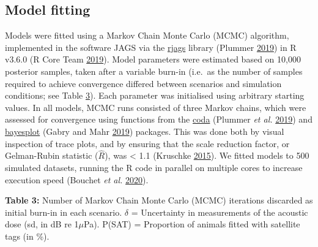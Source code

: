 \documentclass[
]{article}
\begin{document}
\subsection{Model fitting}

Models were fitted using a Markov Chain Monte Carlo (MCMC) algorithm, implemented in the software JAGS via the \href{https://cran.r-project.org/web/packages/rjags/index.html}{rjags} library (Plummer \protect\hyperlink{ref-Plummer2019}{2019}) in R v3.6.0 (R Core Team \protect\hyperlink{ref-RDev2019}{2019}). Model parameters were estimated based on 10,000 posterior samples, taken after a variable burn-in (i.e.~as the number of samples required to achieve convergence differed between scenarios and simulation conditions; see Table \hyperlink{tab3}{3}). Each parameter was initialised using arbitrary starting values. In all models, MCMC runs consisted of three Markov chains, which were assessed for convergence using functions from the \href{https://cran.r-project.org/web/packages/coda/index.html}{coda} (Plummer \emph{et al.} \protect\hyperlink{ref-Plummer2019b}{2019}) and \href{https://mc-stan.org/bayesplot/}{bayesplot} (Gabry and Mahr \protect\hyperlink{ref-Gabry2019}{2019}) packages. This was done both by visual inspection of trace plots, and by ensuring that the scale reduction factor, or Gelman-Rubin statistic (\(\hat{R}\)), was \textless{} 1.1 (Kruschke \protect\hyperlink{ref-Kruschke2010}{2015}). We fitted models to 500 simulated datasets, running the R code in parallel on multiple cores to increase execution speed (Bouchet \emph{et al.} \protect\hyperlink{ref-Bouchet2020b}{2020}).

\textbf{Table 3:} \hypertarget{tab3}{}Number of Markov Chain Monte Carlo (MCMC) iterations discarded as initial burn-in in each scenario. \(\delta\) = Uncertainty in measurements of the acoustic dose (sd, in dB re 1\(\mu\)Pa). P(SAT) = Proportion of animals fitted with satellite tags (in \%).
\end{document}
